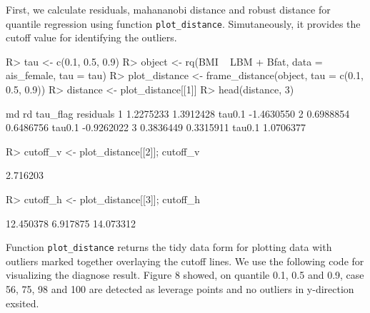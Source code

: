 \documentclass[article]{jss}
\theoremstyle{definition}
\theoremstyle{definition}
\theoremstyle{remark}
\begin{document}
First, we calculate residuals, mahananobi distance and robust distance
for quantile regression using function \texttt{plot\_distance}.
Simutaneously, it provides the cutoff value for identifying the
outliers.

\begin{CodeChunk}

\begin{CodeInput}
R> tau <- c(0.1, 0.5, 0.9)
R> object <- rq(BMI ~ LBM + Bfat, data = ais_female, tau = tau)
R> plot_distance <- frame_distance(object, tau = c(0.1, 0.5, 0.9))
R> distance <- plot_distance[[1]]
R> head(distance, 3)
\end{CodeInput}

\begin{CodeOutput}
         md        rd tau_flag  residuals
1 1.2275233 1.3912428   tau0.1 -1.4630550
2 0.6988854 0.6486756   tau0.1 -0.9262022
3 0.3836449 0.3315911   tau0.1  1.0706377
\end{CodeOutput}

\begin{CodeInput}
R> cutoff_v <- plot_distance[[2]]; cutoff_v
\end{CodeInput}

\begin{CodeOutput}
[1] 2.716203
\end{CodeOutput}

\begin{CodeInput}
R> cutoff_h <- plot_distance[[3]]; cutoff_h
\end{CodeInput}

\begin{CodeOutput}
[1] 12.450378  6.917875 14.073312
\end{CodeOutput}
\end{CodeChunk}

Function \texttt{plot\_distance} returns the tidy data form for plotting
data with outliers marked together overlaying the cutoff lines. We use
the following code for visualizing the diagnose result. Figure 8 showed,
on quantile 0.1, 0.5 and 0.9, case 56, 75, 98 and 100 are detected as
leverage points and no outliers in y-direction exsited.
\end{document}
